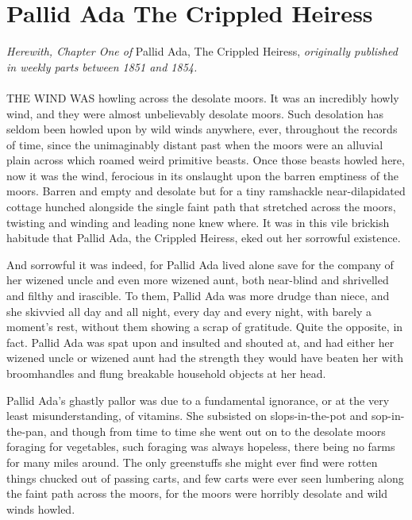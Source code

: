 \chapter{Pallid Ada The Crippled Heiress}

\emph{Herewith, Chapter One of} Pallid Ada, The Crippled Heiress, \emph{originally published in weekly parts between 1851 and 1854.}
\\
\\
THE WIND WAS howling across the desolate moors. It was an incredibly howly wind, and they were almost unbelievably desolate moors. Such desolation has seldom been howled upon by wild winds anywhere, ever, throughout the records of time, since the unimaginably distant past when the moors were an alluvial plain across which roamed weird primitive beasts. Once those beasts howled here, now it was the wind, ferocious in its onslaught upon the barren emptiness of the moors. Barren and empty and desolate but for a tiny ramshackle near-dilapidated cottage hunched alongside the single faint path that stretched across the moors, twisting and winding and leading none knew where. It was in this vile brickish habitude that Pallid Ada, the Crippled Heiress, eked out her sorrowful existence.

And sorrowful it was indeed, for Pallid Ada lived alone save for the company of her wizened uncle and even more wizened aunt, both near-blind and shrivelled and filthy and irascible. To them, Pallid Ada was more drudge than niece, and she skivvied all day and all night, every day and every night, with barely a moment's rest, without them showing a scrap of gratitude. Quite the opposite, in fact. Pallid Ada was spat upon and insulted and shouted at, and had either her wizened uncle or wizened aunt had the strength they would have beaten her with broomhandles and flung breakable household objects at her head.

Pallid Ada's ghastly pallor was due to a fundamental ignorance, or at the very least misunderstanding, of vitamins. She subsisted on slops-in-the-pot and sop-in-the-pan, and though from time to time she went out on to the desolate moors foraging for vegetables, such foraging was always hopeless, there being no farms for many miles around. The only greenstuffs she might ever find were rotten things chucked out of passing carts, and few carts were ever seen lumbering along the faint path across the moors, for the moors were horribly desolate and wild winds howled.

